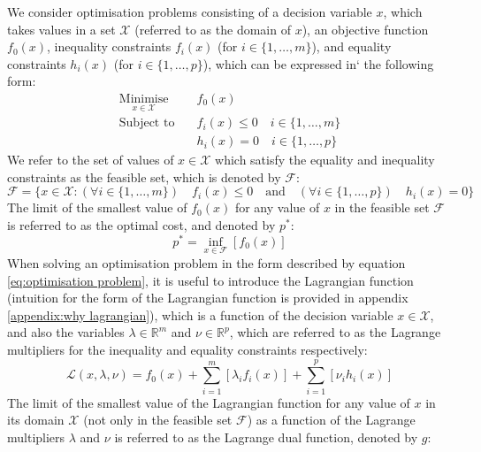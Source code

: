 We consider optimisation problems consisting of a decision variable $x$, which takes values in a set $\mathcal{X}$ (referred to as the domain of $x$), an objective function $f_0(x)$, inequality constraints $f_i(x)$ (for $i\in\{1, \hdots, m\}$), and equality constraints $h_i(x)$ (for $i\in\{1, \hdots, p\}$), which can be expressed in` the following form:
\begin{equation}
\begin{aligned}
    \underset{x \in \mathcal{X}}{\text{Minimise}} \quad & f_0(x) \\
    \text{Subject to} \quad & f_i(x) \le 0 \quad i\in\{1, \hdots, m\} \\
    & h_i(x) = 0 \quad i\in\{1, \hdots, p\}
\end{aligned} \label{eq:optimisation problem}
\end{equation}
We refer to the set of values of $x\in\mathcal{X}$ which satisfy the equality and inequality constraints as the feasible set, which is denoted by $\mathcal{F}$:
\begin{equation}
    \mathcal{F} = \{ x\in\mathcal{X}: (\forall i\in\{1, \hdots, m\}) \quad f_i(x) \le 0 \quad \text{and} \quad (\forall i\in\{1, \hdots, p\}) \quad h_i(x) = 0 \}
\end{equation}
The limit of the smallest value of $f_0(x)$ for any value of $x$ in the feasible set $\mathcal{F}$ is referred to as the optimal cost, and denoted by $p^*$:
\begin{equation}
    p^* = \underset{x\in\mathcal{F}}{\inf}\left[f_0(x)\right]
\end{equation}
When solving an optimisation problem in the form described by equation \ref{eq:optimisation problem}, it is useful to introduce the Lagrangian function \cite{boyd2004convex} (intuition for the form of the Lagrangian function is provided in appendix \ref{appendix:why lagrangian}), which is a function of the decision variable $x\in\mathcal{X}$, and also the variables $\lambda \in \mathbb{R}^m $ and $\nu\in\mathbb{R}^p$, which are referred to as the Lagrange multipliers for the inequality and equality constraints respectively:
\begin{equation}
    \mathcal{L}(x, \lambda, \nu) = f_0(x) + \sum_{i=1}^{m}[\lambda_i f_i(x)] + \sum_{i=1}^{p}[\nu_i h_i(x)] \label{eq:Lagrangian}
\end{equation}
The limit of the smallest value of the Lagrangian function for any value of $x$ in its domain $\mathcal{X}$ (not only in the feasible set $\mathcal{F}$) as a function of the Lagrange multipliers $\lambda$ and $\nu$ is referred to as the Lagrange dual function, denoted by $g$:
